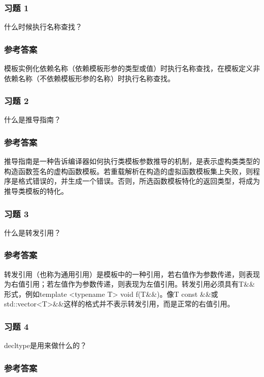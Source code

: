 \subsubsection{习题 1}

什么时候执行名称查找？

\subsubsection{参考答案}

模板实例化依赖名称（依赖模板形参的类型或值）时执行名称查找，在模板定义非依赖名称（不依赖模板形参的名称）时执行名称查找。


\subsubsection{习题 2}

什么是推导指南？

\subsubsection{参考答案}

推导指南是一种告诉编译器如何执行类模板参数推导的机制，是表示虚构类类型的构造函数签名的虚构函数模板。若重载解析在构造的虚拟函数模板集上失败，则程序是格式错误的，并生成一个错误。否则，所选函数模板特化的返回类型，将成为推导类模板的特化。

\subsubsection{习题 3}

什么是转发引用？

\subsubsection{参考答案}

转发引用（也称为通用引用）是模板中的一种引用，若右值作为参数传递，则表现为右值引用；若左值作为参数传递，则表现为左值引用。转发引用必须具有T\&\&形式，例如template <typename T> void f(T\&\&)。像T const \&\&或std::vector<T>\&\&这样的格式并不表示转发引用，而是正常的右值引用。

\subsubsection{习题 4}

decltype是用来做什么的？

\subsubsection{参考答案}

